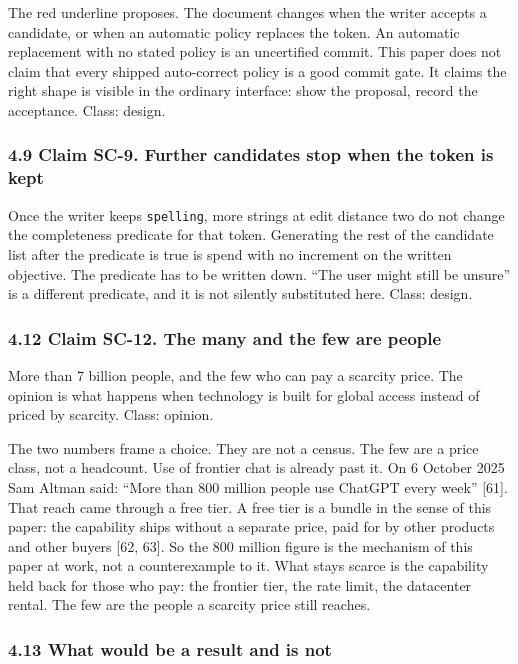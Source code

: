 \documentclass[
  10pt,
]{article}
\begin{document}
The red underline proposes. The document changes when the writer accepts
a candidate, or when an automatic policy replaces the token. An
automatic replacement with no stated policy is an uncertified commit.
This paper does not claim that every shipped auto-correct policy is a
good commit gate. It claims the right shape is visible in the ordinary
interface: show the proposal, record the acceptance. Class: design.

\subsubsection{4.9 Claim SC-9. Further candidates stop when the token is
kept}\label{claim-sc-9.-further-candidates-stop-when-the-token-is-kept}

Once the writer keeps \texttt{spelling}, more strings at edit distance
two do not change the completeness predicate for that token. Generating
the rest of the candidate list after the predicate is true is spend with
no increment on the written objective. The predicate has to be written
down. ``The user might still be unsure'' is a different predicate, and
it is not silently substituted here. Class: design.

\subsubsection{4.12 Claim SC-12. The many and the few are
people}\label{claim-sc-12.-the-many-and-the-few-are-people}

More than 7 billion people, and the few who can pay a scarcity price.
The opinion is what happens when technology is built for global access
instead of priced by scarcity. Class: opinion.

The two numbers frame a choice. They are not a census. The few are a
price class, not a headcount. Use of frontier chat is already past it.
On 6 October 2025 Sam Altman said: ``More than 800 million people use
ChatGPT every week'' {[}61{]}. That reach came through a free tier. A
free tier is a bundle in the sense of this paper: the capability ships
without a separate price, paid for by other products and other buyers
{[}62, 63{]}. So the 800 million figure is the mechanism of this paper
at work, not a counterexample to it. What stays scarce is the capability
held back for those who pay: the frontier tier, the rate limit, the
datacenter rental. The few are the people a scarcity price still
reaches.

\subsubsection{4.13 What would be a result and is
not}\label{what-would-be-a-result-and-is-not}
\end{document}
